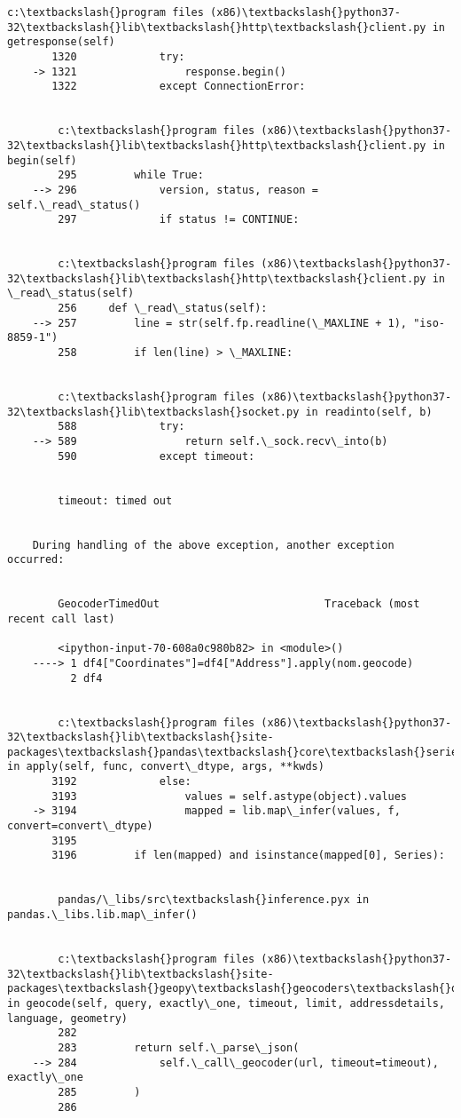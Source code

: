 \documentclass[11pt]{article}
\begin{document}
\begin{Verbatim}[commandchars=\\\{\}]
        c:\textbackslash{}program files (x86)\textbackslash{}python37-32\textbackslash{}lib\textbackslash{}http\textbackslash{}client.py in getresponse(self)
       1320             try:
    -> 1321                 response.begin()
       1322             except ConnectionError:
    

        c:\textbackslash{}program files (x86)\textbackslash{}python37-32\textbackslash{}lib\textbackslash{}http\textbackslash{}client.py in begin(self)
        295         while True:
    --> 296             version, status, reason = self.\_read\_status()
        297             if status != CONTINUE:
    

        c:\textbackslash{}program files (x86)\textbackslash{}python37-32\textbackslash{}lib\textbackslash{}http\textbackslash{}client.py in \_read\_status(self)
        256     def \_read\_status(self):
    --> 257         line = str(self.fp.readline(\_MAXLINE + 1), "iso-8859-1")
        258         if len(line) > \_MAXLINE:
    

        c:\textbackslash{}program files (x86)\textbackslash{}python37-32\textbackslash{}lib\textbackslash{}socket.py in readinto(self, b)
        588             try:
    --> 589                 return self.\_sock.recv\_into(b)
        590             except timeout:
    

        timeout: timed out

        
    During handling of the above exception, another exception occurred:
    

        GeocoderTimedOut                          Traceback (most recent call last)

        <ipython-input-70-608a0c980b82> in <module>()
    ----> 1 df4["Coordinates"]=df4["Address"].apply(nom.geocode)
          2 df4
    

        c:\textbackslash{}program files (x86)\textbackslash{}python37-32\textbackslash{}lib\textbackslash{}site-packages\textbackslash{}pandas\textbackslash{}core\textbackslash{}series.py in apply(self, func, convert\_dtype, args, **kwds)
       3192             else:
       3193                 values = self.astype(object).values
    -> 3194                 mapped = lib.map\_infer(values, f, convert=convert\_dtype)
       3195 
       3196         if len(mapped) and isinstance(mapped[0], Series):
    

        pandas/\_libs/src\textbackslash{}inference.pyx in pandas.\_libs.lib.map\_infer()
    

        c:\textbackslash{}program files (x86)\textbackslash{}python37-32\textbackslash{}lib\textbackslash{}site-packages\textbackslash{}geopy\textbackslash{}geocoders\textbackslash{}osm.py in geocode(self, query, exactly\_one, timeout, limit, addressdetails, language, geometry)
        282 
        283         return self.\_parse\_json(
    --> 284             self.\_call\_geocoder(url, timeout=timeout), exactly\_one
        285         )
        286 
    


\end{Verbatim}
\end{document}
